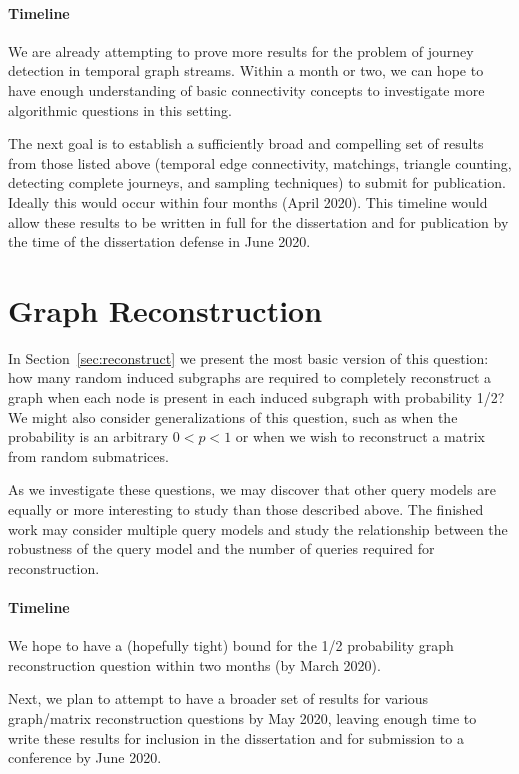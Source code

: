 
\paragraph*{Timeline}
We are already attempting to prove more results for the problem of journey detection in temporal graph streams.  Within a month or two, we can hope to have enough understanding of basic connectivity concepts to investigate more algorithmic questions in this setting.

The next goal is to establish a sufficiently broad and compelling set of results from those listed above (temporal edge connectivity, matchings, triangle counting, detecting complete journeys, and sampling techniques) to submit for publication.  Ideally this would occur within four months (April 2020).  This timeline would allow these results to be written in full for the dissertation and for publication by the time of the dissertation defense in June 2020.


\section{Graph Reconstruction}
In Section~\ref{sec:reconstruct} we present the most basic version of this question: how many random induced subgraphs are required to completely reconstruct a graph when each node is present in each induced subgraph with probability 1/2?  We might also consider generalizations of this question, such as when the probability is an arbitrary $0 < p < 1$ or when we wish to reconstruct a matrix from random submatrices.

As we investigate these questions, we may discover that other query models are equally or more interesting to study than those described above.  The finished work may consider multiple query models and study the relationship between the robustness of the query model and the number of queries required for reconstruction.

\paragraph*{Timeline}
We hope to have a (hopefully tight) bound for the 1/2 probability graph reconstruction question within two months (by March 2020).

Next, we plan to attempt to have a broader set of results for various graph/matrix reconstruction questions by May 2020, leaving enough time to write these results for inclusion in the dissertation and for submission to a conference by June 2020.